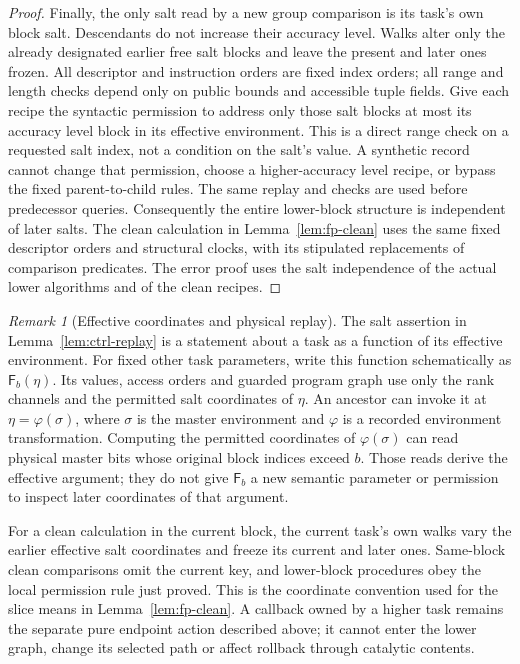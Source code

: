 \documentclass[11pt]{article}
\numberwithin{equation}{section}
\theoremstyle{definition}
\theoremstyle{remark}
\newtheorem{remark}[theorem]{Remark}
\begin{document}
\begin{proof}
Finally, the only salt read by a new group comparison is its task's
own block salt.  Descendants do not increase their accuracy level.  Walks alter
only the already designated earlier free salt blocks and leave the
present and later ones frozen.  All descriptor and instruction orders
are fixed index orders; all range and length checks depend only on
public bounds and accessible tuple fields.  Give each recipe the
syntactic permission to address only those salt blocks at most its
accuracy level block in its effective environment.  This is a direct range check
on a requested salt index,
not a condition on the salt's value.  A synthetic record cannot change
that permission, choose a higher-accuracy level recipe, or bypass the fixed
parent-to-child rules.  The same replay and checks are used before
predecessor queries.  Consequently the entire lower-block structure is
independent of later salts.  The clean calculation in
Lemma~\ref{lem:fp-clean} uses the same fixed descriptor orders and
structural clocks, with its stipulated replacements of comparison
predicates.  The error proof uses the salt independence of the actual lower
algorithms and of the clean recipes.
\end{proof}

\begin{remark}[Effective coordinates and physical replay]
\label{rem:ctrl-effective-environment}
The salt assertion in Lemma~\ref{lem:ctrl-replay} is a statement about a
task as a function of its effective environment.  For fixed other task
parameters, write this function schematically as ${\mathsf{F}}_b(\eta)$.  Its
values, access orders and guarded program graph use only the rank
channels and the permitted salt coordinates of $\eta$.  An ancestor can
invoke it at $\eta=\varphi(\sigma)$, where $\sigma$ is the master
environment and $\varphi$ is a recorded environment transformation.
Computing the permitted coordinates of $\varphi(\sigma)$ can read
physical master bits whose original block indices exceed $b$.  Those
reads derive the effective argument; they do not give ${\mathsf{F}}_b$ a new
semantic parameter or permission to inspect later coordinates of that
argument.

For a clean calculation in the current block, the current task's own
walks vary the earlier effective salt coordinates and freeze its current
and later ones.  Same-block clean comparisons omit the current key, and
lower-block procedures obey the local permission rule just proved.
This is the coordinate convention used for the slice means in
Lemma~\ref{lem:fp-clean}.  A callback owned by a higher task remains the
separate pure endpoint action described above; it cannot enter the lower
graph, change its selected path or affect rollback through catalytic
contents.
\end{remark}
\end{document}
